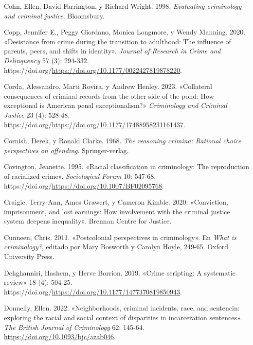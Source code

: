 \documentclass[
  spanish,
  letterpaper,
  DIV=11,
  numbers=noendperiod]{scrreprt}
\newlength{\cslhangindent}
\newenvironment{CSLReferences}[2] %
 {\begin{list}{}{%
  \setlength{\itemindent}{0pt}
  \setlength{\leftmargin}{0pt}
  \setlength{\parsep}{0pt}
  \ifodd #1
   \setlength{\leftmargin}{\cslhangindent}
   \setlength{\itemindent}{-1\cslhangindent}
  \fi
  \setlength{\itemsep}{#2\baselineskip}}}
 {\end{list}}
\begin{document}
\begin{CSLReferences}{1}{0}
Cohn, Ellen, David Farrington, y Richard Wright. 1998. \emph{Evaluating
criminology and criminal justice}. Bloomsbury.

Copp, Jennifer E., Peggy Giordano, Monica Longmore, y Wendy Manning.
2020. {«Desistance from crime during the transition to adulthood: The
influence of parents, peers, and shifts in identity»}. \emph{Journal of
Research in Crime and Delinquency} 57 (3): 294-332.
https://doi.org/\url{https://doi.org/10.1177/0022427819878220}.

Corda, Alessandro, Marti Rovira, y Andrew Henley. 2023. {«Collateral
consequences of criminal records from the other side of the pond: How
exceptional is American penal exceptionalism?»} \emph{Criminology and
Criminal Justice} 23 (4): 528-48.
https://doi.org/\url{https://doi.org/10.1177/17488958231161437}.

Cornish, Derek, y Ronald Clarke. 1968. \emph{The reasoning crimina:
Rational choice perspectives on offending}. Springer-verlag.

Covington, Jeanette. 1995. {«Racial classification in criminology: The
reproduction of racialized crime»}. \emph{Sociological Forum} 10:
547-68. https://doi.org/\url{https://doi.org/10.1007/BF02095768}.

Craigie, Terry-Ann, Ames Grawert, y Cameron Kimble. 2020. {«Conviction,
imprisonment, and lost earnings: How involvement with the criminal
justice system deepens inequality»}. Brennan Centre for Justice.

Cunneen, Chris. 2011. {«Postcolonial perspectives in criminology»}. En
\emph{What is criminology?}, editado por Mary Bosworth y Carolyn Hoyle,
249-65. Oxford University Press.

Dehghanniri, Hashem, y Herve Borrion. 2019. {«Crime scripting: A
systematic review»} 18 (4): 504-25.
https://doi.org/\url{https://doi.org/10.1177/1477370819850943}.

Donnelly, Ellen. 2022. {«Neighborhoods, criminal incidents, race, and
sentencin: exploring the racial and social context of disparities in
incarceration sentences»}. \emph{The British Journal of Criminology} 62:
145-64. \url{https://doi.org/10.1093/bjc/azab046}.


\end{CSLReferences}
\end{document}
